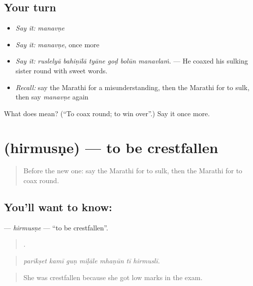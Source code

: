 \subsection*{Your turn}
\begin{itemize}
\raggedright
  \item \emph{Say it:} \emph{manavṇe}
  \item \emph{Say it:} \emph{manavṇe}, once more
  \item \emph{Say it:} \emph{ruslelyā bahiṇīlā tyāne goḍ bolūn manavlaṁ.} — He coaxed his sulking sister round with sweet words.
  \item \emph{Recall:} say the Marathi for a misunderstanding, then the Marathi for to sulk, then say \emph{manavṇe} again
\end{itemize}

\begin{tcolorbox}[breakable,colback=teal!4,colframe=teal!35!black,title={Before you move on}]
What does  mean? (\textquotedblleft{}To coax round; to win over\textquotedblright{}.) Say it once more.
\end{tcolorbox}
\section[\texorpdfstring{\mr{हिरमुसणे} (hirmusṇe)}{हिरमुसणे (hirmusṇe)}]{ (hirmusṇe) — to be crestfallen}

\label{lesson:MR-C454-hirmusne}



\begin{quote}
Before the new one: say the Marathi for to sulk, then the Marathi for to coax round.
\end{quote}

\subsection*{You'll want to know: }
\textbf{} — \emph{hirmusṇe} — \textquotedblleft{}to be crestfallen\textquotedblright{}.

\begin{quote}
      .
\end{quote}

\begin{quote}
\emph{parīkṣet kamī guṇ miḷāle mhaṇūn tī hirmuslī.}
\end{quote}

\begin{quote}
She was crestfallen because she got low marks in the exam.
\end{quote}

